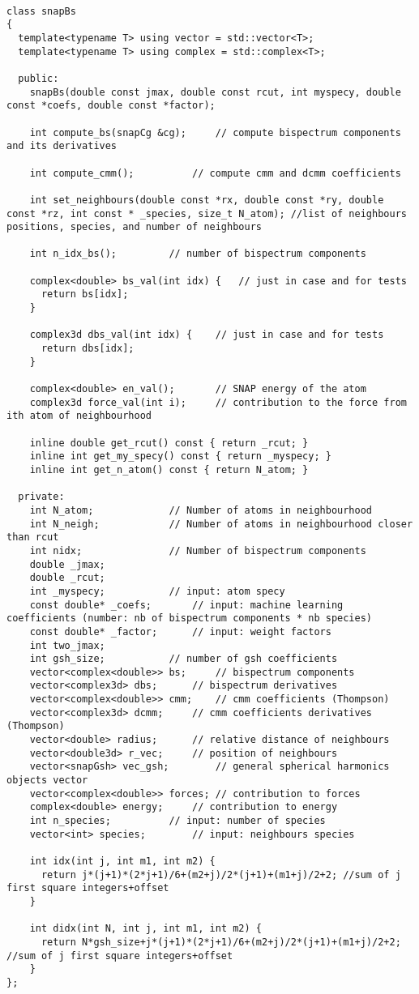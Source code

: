 \documentclass[12pt]{article}
\begin{document}
        \begin{lstlisting}

class snapBs
{
  template<typename T> using vector = std::vector<T>;
  template<typename T> using complex = std::complex<T>;

  public:
    snapBs(double const jmax, double const rcut, int myspecy, double const *coefs, double const *factor);

    int compute_bs(snapCg &cg);		// compute bispectrum components and its derivatives

    int compute_cmm(); 			// compute cmm and dcmm coefficients

    int set_neighbours(double const *rx, double const *ry, double const *rz, int const * _species, size_t N_atom); //list of neighbours positions, species, and number of neighbours

    int n_idx_bs();			// number of bispectrum components

    complex<double> bs_val(int idx) {	// just in case and for tests
      return bs[idx];
    }

    complex3d dbs_val(int idx) {	// just in case and for tests
      return dbs[idx];
    }

    complex<double> en_val();		// SNAP energy of the atom
    complex3d force_val(int i);		// contribution to the force from ith atom of neighbourhood

    inline double get_rcut() const { return _rcut; }
    inline int get_my_specy() const { return _myspecy; }
    inline int get_n_atom() const { return N_atom; }

  private:
    int N_atom;				// Number of atoms in neighbourhood
    int N_neigh;			// Number of atoms in neighbourhood closer than rcut
    int nidx;				// Number of bispectrum components
    double _jmax;
    double _rcut;
    int _myspecy;			// input: atom specy
    const double* _coefs;		// input: machine learning coefficients (number: nb of bispectrum components * nb species)
    const double* _factor;		// input: weight factors
    int two_jmax;
    int gsh_size;			// number of gsh coefficients
    vector<complex<double>> bs;		// bispectrum components
    vector<complex3d> dbs;		// bispectrum derivatives
    vector<complex<double>> cmm;	// cmm coefficients (Thompson)
    vector<complex3d> dcmm;		// cmm coefficients derivatives (Thompson)
    vector<double> radius;		// relative distance of neighbours
    vector<double3d> r_vec;		// position of neighbours
    vector<snapGsh> vec_gsh;		// general spherical harmonics objects vector
    vector<complex<double>> forces;	// contribution to forces
    complex<double> energy;		// contribution to energy
    int n_species;			// input: number of species
    vector<int> species;		// input: neighbours species

    int idx(int j, int m1, int m2) {
      return j*(j+1)*(2*j+1)/6+(m2+j)/2*(j+1)+(m1+j)/2+2; //sum of j first square integers+offset
    }

    int didx(int N, int j, int m1, int m2) {
      return N*gsh_size+j*(j+1)*(2*j+1)/6+(m2+j)/2*(j+1)+(m1+j)/2+2; //sum of j first square integers+offset
    }
};


        \end{lstlisting}
\end{document}
